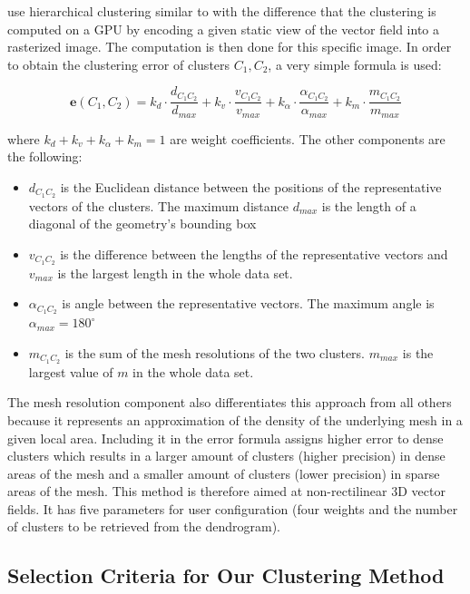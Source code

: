 \citet{Peng12} use hierarchical clustering similar to \citet{Telea99} with the difference that the clustering is computed on a GPU by encoding a given static view of the vector field into a rasterized image. The computation is then done for this specific image. In order to obtain the clustering error of clusters \(C_1, C_2\), a very simple formula is used:

\begin{equation} \label{eq:clustering_error}
\bm{e}(C_1,C_2) = k_d \cdot \frac{d_{C_1C_2}}{d_{max}} + k_v \cdot \frac{v_{C_1C_2}}{v_{max}} + k_\alpha \cdot \frac{\alpha_{C_1C_2}}{\alpha_{max}} + k_m \cdot \frac{m_{C_1C_2}}{m_{max}}
\end{equation}

where \(k_d + k_v + k_\alpha + k_m = 1\) are weight coefficients. The other components are the following:

\begin{itemize}
\item \(d_{C_1C_2}\) is the Euclidean distance between the positions of the representative vectors of the clusters. The maximum distance \(d_{max}\) is the length of a diagonal of the geometry's bounding box
\item \(v_{C_1C_2}\) is the difference between the lengths of the representative vectors and \(v_{max}\) is the largest length in the whole data set.
\item \(\alpha_{C_1C_2}\) is angle between the representative vectors. The maximum angle is \(\alpha_{max} = 180^\circ\)
\item \(m_{C_1C_2}\) is the sum of the mesh resolutions of the two clusters. \(m_{max}\) is the largest value of \(m\) in the whole data set.
\end{itemize}

The mesh resolution component also differentiates this approach from all others because it represents an approximation of the density of the underlying mesh in a given local area. Including it in the error formula assigns higher error to dense clusters which results in a larger amount of clusters (higher precision) in dense areas of the mesh and a smaller amount of clusters (lower precision) in sparse areas of the mesh. This method is therefore aimed at non-rectilinear 3D vector fields. It has five parameters for user configuration (four weights and the number of clusters to be retrieved from the dendrogram).
\subsection{Selection Criteria for Our Clustering Method}

